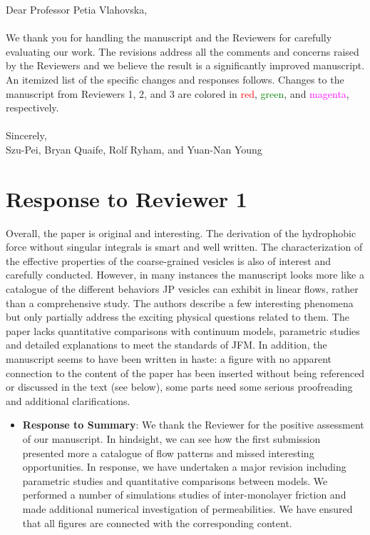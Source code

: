 \documentclass[11pt]{article}
\newcommand{\comment}[1]{{\color{blue} #1}}
\begin{document}
\noindent
Dear Professor Petia Vlahovska,
\\ \\
\noindent
We thank you for handling the manuscript and the
Reviewers for carefully evaluating our work. 
The revisions address all the comments and concerns
raised by the Reviewers 
and we believe the result is a significantly improved manuscript.
An itemized list of the specific changes and responses follows.
Changes to the manuscript from Reviewers 1, 2, and 3 are colored in \textcolor{red}{red},
\textcolor{green}{green}, and \textcolor{magenta}{magenta},
respectively. \\ \\
\noindent
Sincerely,
\\
\noindent
Szu-Pei, Bryan Quaife, Rolf Ryham, and Yuan-Nan Young

\section*{Response to Reviewer 1}
\noindent
\comment{Overall, the paper is original and interesting. The derivation
of the hydrophobic force without singular integrals is smart and well
written. The characterization of the effective properties of the
coarse-grained vesicles is also of interest and carefully conducted.
However, in many instances the manuscript looks more like a catalogue of
the different behaviors JP vesicles can exhibit in linear flows, rather
than a comprehensive study. The authors describe a few interesting
phenomena but only partially address the exciting physical questions
related to them. The paper lacks quantitative comparisons with continuum
models, parametric studies and detailed explanations to meet the
standards of JFM. In addition, the manuscript seems to have been written
in haste: a figure with no apparent connection to the content of the
paper has been inserted without being referenced or discussed in the
text (see below), some parts need some serious proofreading and
additional clarifications.}
\begin{itemize}
\item {\bf Response to Summary}:
  We thank the Reviewer for the positive assessment of our manuscript.
  In hindsight, we can see how the first submission presented more a catalogue
  of flow patterns and missed interesting opportunities.
  In response, we have undertaken a major revision including parametric studies
  and quantitative comparisons between models.
  We performed a number of simulations 
  studies of inter-monolayer friction and
  made additional numerical investigation 
  of permeabilities. We have ensured that all figures are connected with the corresponding content. 
  \begin{quotation}
  \end{quotation}
\end{itemize}
\end{document}
